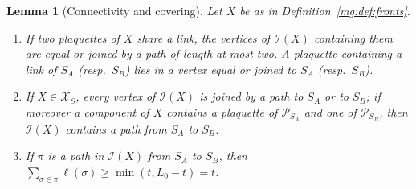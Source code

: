 \documentclass[11pt,a4paper]{article}
\newtheorem{lemma}[theorem]{Lemma}
\theoremstyle{definition}
\theoremstyle{remark}
\newcommand{\cP}{\mathcal{P}}
\newcommand{\cX}{\mathcal{X}}
\begin{document}
\begin{lemma}[Connectivity and covering]\label{mg:lem:incidence}
Let $X$ be as in Definition~\ref{mg:def:fronts}.
\begin{enumerate}[label=(\roman*)]
\item If two plaquettes of $X$ share a link, the vertices of $\mathcal I(X)$ containing them are equal or joined by a path of length at most two.
A plaquette containing a link of $S_A$ (resp.\ $S_B$) lies in a vertex equal or joined to $S_A$ (resp.\ $S_B$).
\item If $X\in\cX_S$, every vertex of $\mathcal I(X)$ is joined by a path to $S_A$ or to $S_B$; if moreover a component of $X$ contains a plaquette of
$\cP_{S_A}$ and one of $\cP_{S_B}$, then $\mathcal I(X)$ contains a path from $S_A$ to $S_B$.
\item If $\pi$ is a path in $\mathcal I(X)$ from $S_A$ to $S_B$, then $\sum_{\sigma\in\pi}\ell(\sigma)\ge\min(t,L_0-t)=t$.
\end{enumerate}
\end{lemma}
\end{document}
